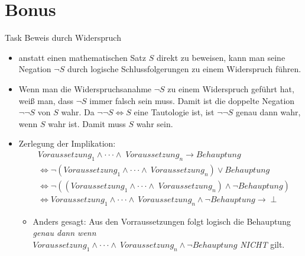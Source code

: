 
\section{Bonus}

\begin{frame}[allowframebreaks]{Task \thesection}{Beweis durch Widerspruch}
  \begin{itemize}
    \item anstatt einen mathematischen Satz $S$ direkt zu beweisen, kann man seine Negation $\neg S$ durch logische Schlussfolgerungen zu einem Widerspruch führen.
    \item Wenn man die Widerspruchsanahme $\neg S$ zu einem Widerspruch geführt hat, weiß man, dass $\neg S$ immer falsch sein muss. Damit ist die doppelte Negation $\neg\neg S$ von $S$ wahr. Da $\neg\neg S \Leftrightarrow S$ eine Tautologie ist, ist $\neg\neg S$ genau dann wahr, wenn $S$ wahr ist. Damit muss $S$ wahr sein.
    \item \alert{Zerlegung der Implikation:}
    \begin{align*}
      &V o r a u s s e t z u n g_{1}\wedge\cdot\cdot\cdot\wedge\;V o r a u s s e t z u n g_{n}\rightarrow B e h a u p t u n g\\
      &\Leftrightarrow \neg\left(V o r a u s s e t z u n g_{1}\wedge\cdot\cdot\cdot\wedge\ V o r a u s s e t z u n g_{n}\right)\vee B e h a u p t u n g\\
      &\Leftrightarrow \neg\left(\left(V o r a u s s e t z u n g_{1}\wedge\cdot\cdot\cdot\wedge\;V o r a u s s e t z u n g_{n}\right)\wedge\neg B e h a u p t u n g\right)\\
      &\Leftrightarrow V o r a u s s e t z u n g_{1}\wedge\cdot\cdot\cdot\wedge\ V o r a u s s e t z u n g_{n}\wedge\lnot B e h a u p t u n g \rightarrow \perp
    \end{align*}
    \begin{itemize}
      \item \alert{Anders gesagt:} Aus den Vorraussetzungen folgt logisch die Behauptung \textit{genau dann wenn} $V o r a u s s e t z u n g_{1}\wedge\cdot\cdot\cdot\wedge\ V o r a u s s e t z u n g_{n}\wedge\lnot B e h a u p t u n g$ \textit{NICHT} gilt.
    \end{itemize}
  \end{itemize}
  \begin{Sidenote}

\end{Sidenote}
\end{frame}
